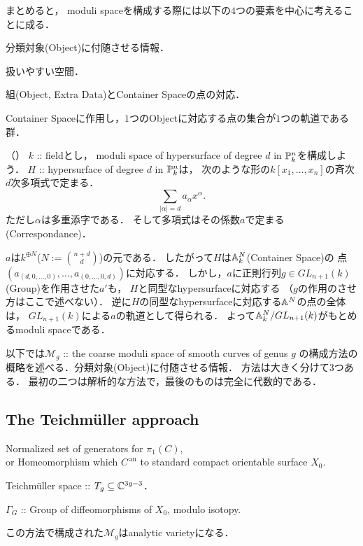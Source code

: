 \documentclass[a4paper]{jsarticle}
\newcommand{\tp}[2]{\texorpdfstring{#1}{#2}}
\newcommand{\modM}{\mathcal{M}}
\newcommand{\an}[1]{{#1}^{\,\mathrm{an}}}
\begin{document}
    まとめると，
    moduli spaceを構成する際には以下の$4$つの要素を中心に考えることに成る．
    \begin{description}[leftmargin=!,labelwidth=\widthof{\bfseries Container Space}]
        \item[Extra Data] 分類対象(Object)に付随させる情報．
        \item[Container Space] 扱いやすい空間．
        \item[Correspondance] 組(Object, Extra Data)とContainer Spaceの点の対応．
        \item[Group] Container Spaceに作用し，$1$つのObjectに対応する点の集合が$1$つの軌道である群．
    \end{description}
    
    \begin{Example}（\cite{Muk1}）
        $k$ :: fieldとし，
        moduli space of hypersurface of degree $d$ in $\mathbb{P}_{k}^n$を構成しよう．
        $H$ :: hypersurface of degree $d$ in $\mathbb{P}_{k}^n$は，
        次のような形の$k[x_1,\dots,x_n]$の斉次$d$次多項式で定まる．
        \[ \sum_{|\alpha|=d} a_{\alpha} x^{\alpha}. \]
        ただし$\alpha$は多重添字である．
        そして多項式はその係数$a$で定まる(Correspondance)．
        
        $a$は$k^{\oplus N}$($N:=\binom{n+d}{d}$)の元である．
        したがって$H$は$\mathbb{A}_k^N$(Container Space)の
        点$(a_{(d,0,\dots,0)}, \dots, a_{(0,\dots,0,d)})$に対応する．
        しかし，$a$に正則行列$g \in GL_{n+1}(k)$ (Group)を作用させた$a'$も，
        $H$と同型なhypersurfaceに対応する
        （$g$の作用のさせ方はここで述べない）．
        逆に$H$の同型なhypersurfaceに対応する$\mathbb{A}^N$の点の全体は，
        $GL_{n+1}(k)$による$a$の軌道として得られる．
        よって$\mathbb{A}_k^N/GL_{n+1}(k)$がもとめるmoduli spaceである．
    \end{Example}

    以下では$\modM_g$ :: the coarse moduli space of smooth curves of genus $g$
    の構成方法の概略を述べる．分類対象(Object)に付随させる情報．
    方法は大きく分けて$3$つある．
    最初の二つは解析的な方法で，最後のものは完全に代数的である．

    \subsection{The Teichm\tp{\"u}{u}ller approach}
    \begin{description}[leftmargin=!,labelwidth=\widthof{\bfseries Container Space}]
        \item[Extra Data]
            Normalized set of generators for $\pi_1(C)$, \\
            or Homeomorphism which $\an{C}$ to standard compact orientable surface $X_0$.
        \item[Container Space] Teichm\"uller space :: $T_g \subseteq \mathbb{C}^{3g-3}$．
        \item[Group] $\Gamma_G$ :: Group of diffeomorphisms of $X_0$, modulo isotopy.
    \end{description}
    この方法で構成された$\modM_g$はanalytic varietyになる．
\end{document}
